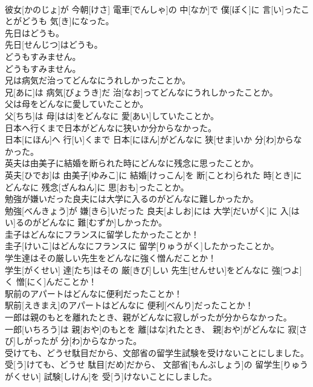 \documentclass[8pt]{extreport}
\begin{document}
\begin{CJK}{UTF8}{min}
\\	彼女[かのじょ]が 今朝[けさ] 電車[でんしゃ]の 中[なか]で 僕[ぼく]に 言[い]ったことがどうも 気[き]になった。
\\	先日はどうも。	
\\	先日[せんじつ]はどうも。
\\	どうもすみません。	
\\	どうもすみません。
\\	兄は病気だ治ってどんなにうれしかったことか。	
\\	兄[あに]は 病気[びょうき]だ 治[なお]ってどんなにうれしかったことか。
\\	父は母をどんなに愛していたことか。	
\\	父[ちち]は 母[はは]をどんなに 愛[あい]していたことか。
\\	日本へ行くまで日本がどんなに狭いか分からなかった。	
\\	日本[にほん]へ 行[い]くまで 日本[にほん]がどんなに 狭[せま]いか 分[わ]からなかった。
\\	英夫は由美子に結婚を断られた時にどんなに残念に思ったことか。	
\\	英夫[ひでお]は 由美子[ゆみこ]に 結婚[けっこん]を 断[ことわ]られた 時[とき]にどんなに 残念[ざんねん]に 思[おも]ったことか。
\\	勉強が嫌いだった良夫には大学に入るのがどんなに難しかったか。	
\\	勉強[べんきょう]が 嫌[きら]いだった 良夫[よしお]には 大学[だいがく]に 入[はい]るのがどんなに 難[むずか]しかったか。
\\	圭子はどんなにフランスに留学したかったことか！	
\\	圭子[けいこ]はどんなにフランスに 留学[りゅうがく]したかったことか。
\\	学生達はその厳しい先生をどんなに強く憎んだことか！	
\\	学生[がくせい] 達[たち]はその 厳[きび]しい 先生[せんせい]をどんなに 強[つよ]く 憎[にく]んだことか！
\\	駅前のアパートはどんなに便利だったことか！	
\\	駅前[えきまえ]のアパートはどんなに 便利[べんり]だったことか！
\\	一郎は親のもとを離れたとき、親がどんなに寂しがったが分からなかった。	
\\	一郎[いちろう]は 親[おや]のもとを 離[はな]れたとき、 親[おや]がどんなに 寂[さび]しがったが 分[わ]からなかった。
\\	受けても、どうせ駄目だから、文部省の留学生試験を受けないことにしました。	
\\	受[う]けても、どうせ 駄目[だめ]だから、 文部省[もんぶしょう]の 留学生[りゅうがくせい] 試験[しけん]を 受[う]けないことにしました。

\end{CJK}
\end{document}
